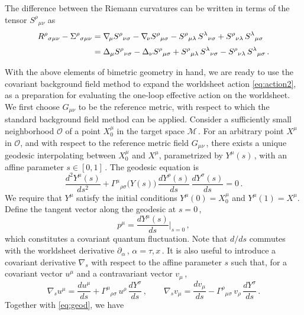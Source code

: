 \documentclass[11pt]{article}
\newcommand{\be}{\begin{equation}}
\newcommand{\ee}{\end{equation}}
\newcommand{\CM}{\mathcal{M}}
\newcommand{\CO}{\mathcal{O}}
\newcommand{\p}{\partial}
\begin{document}
%
The difference between the Riemann curvatures can be written in terms of the tensor $S^\rho{}_{\mu\nu}$ as
%
\begin{align}
\begin{split}
	R^\rho{}_{\sigma\mu\nu} - \Sigma^\rho{}_{\sigma\mu\nu} 
		& = \nabla_{\!\mu} S^\rho{}_{\nu\sigma} - \nabla_{\!\nu} S^\rho{}_{\mu\sigma} - S^\rho{}_{\mu\lambda} \, S^\lambda{}_{\nu\sigma} + S^\rho{}_{\nu\lambda} \, S^\lambda{}_{\mu\sigma} \notag \\[2pt]
		& = \Delta_{\mu} S^\rho{}_{\nu\sigma} - \Delta_{\nu} S^\rho{}_{\mu\sigma} + S^\rho{}_{\mu\lambda} \, S^\lambda{}_{\nu\sigma} - S^\rho{}_{\nu\lambda} \, S^\lambda{}_{\mu\sigma}\,.
\end{split}
\end{align}

With the above elements of bimetric geometry in hand, we are ready to use the covariant background field method to expand the worldsheet action \eqref{eq:action2}, as a preparation for evaluating the one-loop effective action on the worldsheet. We first choose $G_{\mu\nu}$ to be the reference metric, with respect to which the standard background field method can be applied. Consider a sufficiently small neighborhood $\CO$ of a point $X_0^\mu$ in the target space $\CM$\,. For an arbitrary point $X^\mu$ in $\CO$, and with respect to the reference metric field $G_{\mu\nu}$\,, there exists a unique geodesic interpolating between $X_0^\mu$ and $X^\mu$, parametrized by $Y^\mu (s)$\,, with an affine parameter $s \in [0, 1]$\,. The geodesic equation is
%
\be \label{eq:geod}
	\frac{d^2 Y^\mu (s)}{d s^2} + \Gamma^\mu{}_{\rho\sigma} \bigl(Y(s)\bigr) \, \frac{d Y^\rho (s)}{ds} \, \frac{d Y^\sigma (s)}{d s} = 0\,.
\ee  
%
We require that $Y^\mu$ satisfy the initial conditions $Y^\mu (0) = X_0^\mu$ and $Y^\mu (1) = X^\mu$. Define the tangent vector along the geodesic at $s=0$\,,
%
\be \label{eq:ellmu}
	p^\mu = \frac{dY^\mu(s)}{ds} \bigg|_{s=0}\,,
\ee
%
which constitutes a covariant quantum fluctuation. Note that $d/ ds$ commutes with the worldsheet derivative $\p_\alpha$\,, $\alpha = \tau, x$\,. It is also useful to introduce a covariant derivative $\nabla_{\!s}$ with respect to the affine parameter $s$ such that, for a covariant vector $u^\mu$ and a contravariant vector $v_\mu$\,,
%
\be \label{eq:nablas}
	\nabla_{\!s} u^\mu = \frac{du^\mu}{ds} + \Gamma^\mu{}_{\rho\sigma} \, u^\rho \, \frac{dY^\sigma}{ds} \,,
		\qquad
	\nabla_{\!s} v_\mu = \frac{dv_\mu}{ds} - \Gamma^\rho{}_{\mu\sigma} \, v_\rho \, \frac{dY^\sigma}{ds} \,.
\ee
%
Together with \eqref{eq:geod}, we have \cite{Howe:1986vm}
\end{document}
